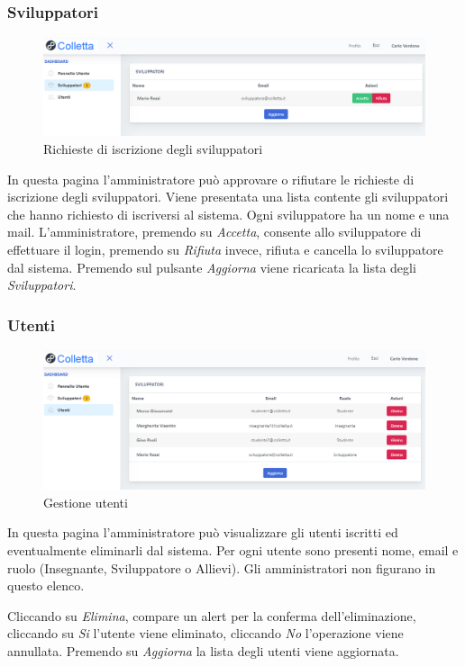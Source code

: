 		\subsubsection{Sviluppatori}
			\begin{figure}[H]
				\centering
				\includegraphics[width=17cm]{sez/img/amministratore/conf_ric_svil.PNG}
				\caption{Richieste di iscrizione degli sviluppatori}\label{fig:1}
			\end{figure}
		  In questa pagina l'amministratore può approvare o rifiutare le richieste di iscrizione degli sviluppatori. Viene presentata una lista contente gli sviluppatori che hanno richiesto di iscriversi al sistema. Ogni sviluppatore ha un nome e una mail. L'amministratore, premendo su \textit{Accetta}, consente allo sviluppatore di effettuare il login, premendo su \textit{Rifiuta} invece, rifiuta e cancella lo sviluppatore dal sistema. Premendo sul pulsante \textit{Aggiorna} viene ricaricata la lista degli \textit{Sviluppatori}.


		\subsubsection{Utenti}
			\begin{figure}[H]
				\centering
				\includegraphics[width=17cm]{sez/img/amministratore/gestisciutenti.PNG}
				\caption{Gestione utenti}\label{fig:1}
			\end{figure}
		  In questa pagina l'amministratore può visualizzare gli utenti iscritti ed eventualmente eliminarli dal sistema. Per ogni utente sono presenti nome, email e ruolo (Insegnante, Sviluppatore o Allievi). Gli amministratori non figurano in questo elenco. 
		  
		  Cliccando su \textit{Elimina}, compare un alert per la conferma dell'eliminazione, cliccando su \textit{Si} l'utente viene eliminato, cliccando \textit{No} l'operazione viene annullata. Premendo su \textit{Aggiorna} la lista degli utenti viene aggiornata.
